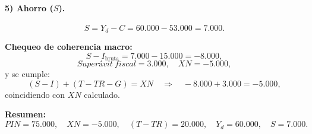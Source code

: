 \documentclass[11pt,addpoints]{article}
\begin{document}
\newpage
\vspace*{0.5cm}
\paragraph{5) Ahorro ($S$).}
\[
S = Y_d - C = 60{.}000 - 53{.}000 = 7{.}000.
\]

\medskip
\textbf{Chequeo de coherencia macro:}
\[
S - I_{\text{bruta}} = 7{.}000 - 15{.}000 = -8{.}000,
\]
\[
Superávit\ fiscal = 3{.}000,\quad XN = -5{.}000,
\]
y se cumple:
\[
(S - I) + (T - TR - G) = XN\quad
\Rightarrow\quad -8{.}000 + 3{.}000 = -5{.}000,
\]
coincidiendo con $XN$ calculado.

\medskip
\textbf{Resumen:}
\[
PIN = 75{.}000,\quad XN = -5{.}000,\quad (T - TR) = 20{.}000,\quad
Y_d = 60{.}000,\quad S = 7{.}000.
\]
\end{document}
